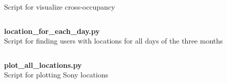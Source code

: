 Script for visualize cross-occupancy
\inputminted[mathescape,
               linenos,
               numbersep=5pt,
               gobble=2,
               frame=lines,
               framesep=2mm]{python}{../tools/scripts/find_user_criteria_for_dataset.py}

\newpage
\textbf{\Large location\_for\_each\_day.py}\\

Script for finding users with locations for all days of the three months
\inputminted[mathescape,
               linenos,
               numbersep=5pt,
               gobble=2,
               frame=lines,
               framesep=2mm]{python}{../tools/scripts/location_for_each_day.py}

\newpage
\textbf{\Large plot\_all\_locations.py}\\
Script for plotting Sony locations
\inputminted[mathescape,
               linenos,
               numbersep=5pt,
               gobble=2,
               frame=lines,
               framesep=2mm]{python}{../tools/scripts/plot_all_locations.py}

